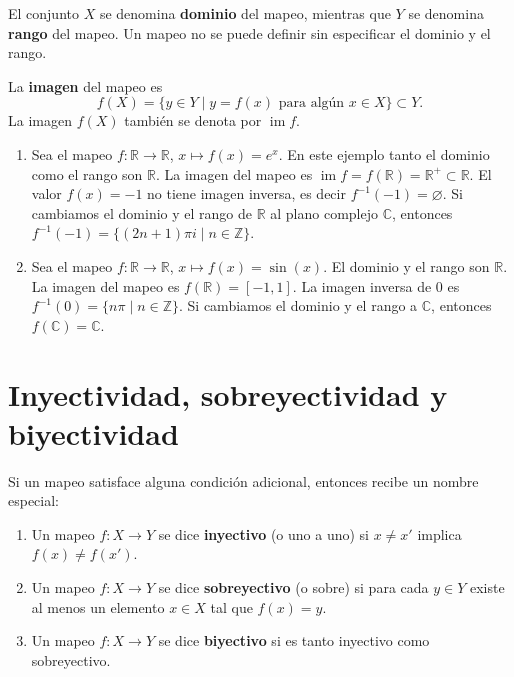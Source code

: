 \begin{definicion}
El conjunto $X$ se denomina \textbf{dominio} del mapeo, mientras que $Y$ se
denomina \textbf{rango} del mapeo. Un mapeo no se puede definir sin
especificar el dominio y el rango.

La \textbf{imagen} del mapeo es
\[
f(X) = \{ y \in Y \mid y = f(x) \text{ para algún } x \in X \} \subset Y .
\]
La imagen $f(X)$ también se denota por $\operatorname{im} f$.
\end{definicion}

\begin{ejemplo}
\begin{enumerate}[label=\alph*)]
\item Sea el mapeo $f : \mathbb{R} \to \mathbb{R}$, $x \mapsto f(x) = e^x$. En
este ejemplo tanto el dominio como el rango son $\mathbb{R}$. La imagen del
mapeo es $\operatorname{im} f = f(\mathbb{R}) = \mathbb{R}^+ \subset
\mathbb{R}$. El valor $f(x) = -1$ no tiene imagen inversa, es decir
$f^{-1}(-1) = \varnothing$. Si cambiamos el dominio y el rango de
$\mathbb{R}$ al plano complejo $\mathbb{C}$, entonces
$f^{-1}(-1) = \{(2n+1)\pi i \mid n \in \mathbb{Z}\}$.

\item Sea el mapeo $f : \mathbb{R} \to \mathbb{R}$, $x \mapsto f(x) =
\sin(x)$. El dominio y el rango son $\mathbb{R}$. La imagen del mapeo es
$f(\mathbb{R}) = [-1,1]$. La imagen inversa de $0$ es
$f^{-1}(0) = \{ n\pi \mid n \in \mathbb{Z}\}$. Si cambiamos el dominio y el
rango a $\mathbb{C}$, entonces $f(\mathbb{C}) = \mathbb{C}$.
\end{enumerate}
\end{ejemplo}

\section{Inyectividad, sobreyectividad y biyectividad}

\begin{definicion}
Si un mapeo satisface alguna condición adicional, entonces recibe un nombre
especial:
\begin{enumerate}[label=\alph*)]
\item Un mapeo $f : X \to Y$ se dice \textbf{inyectivo} (o uno a uno) si
$x \neq x' $ implica $f(x) \neq f(x')$.
\item Un mapeo $f : X \to Y$ se dice \textbf{sobreyectivo} (o sobre) si para
cada $y \in Y$ existe al menos un elemento $x \in X$ tal que $f(x) = y$.
\item Un mapeo $f : X \to Y$ se dice \textbf{biyectivo} si es tanto inyectivo
como sobreyectivo.
\end{enumerate}
\end{definicion}

